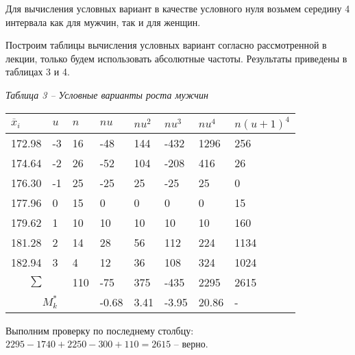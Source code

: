 Для вычисления условных вариант в качестве условного нуля возьмем середину 4 интервала как для мужчин,
так и для женщин.

Построим таблицы вычисления условных вариант согласно рассмотренной в лекции, только будем
использовать абсолютные частоты.
Результаты приведены в таблицах 3 и 4.

\noindent\textit{Таблица 3 -- Условные варианты роста мужчин}
\begin{longtable}{|p{1.7cm}|p{1.7cm}|p{1.7cm}|p{1.7cm}|p{1.7cm}|p{1.7cm}|p{1.7cm}|p{1.9cm}|}
    \hline
    $\overline{x}_i$ & $u$ & $n$ & $nu$ & $nu^2$ & $nu^3$ & $nu^4$ & $n(u+1)^4$ \\\hline
    172.98           & -3  & 16  & -48  & 144    & -432   & 1296   & 256        \\\hline
    174.64           & -2  & 26  & -52  & 104    & -208   & 416    & 26         \\\hline
    176.30           & -1  & 25  & -25  & 25     & -25    & 25     & 0          \\\hline
    177.96           & 0   & 15  & 0    & 0      & 0      & 0      & 15         \\\hline
    179.62           & 1   & 10  & 10   & 10     & 10     & 10     & 160        \\\hline
    181.28           & 2   & 14  & 28   & 56     & 112    & 224    & 1134       \\\hline
    182.94           & 3   & 4   & 12   & 36     & 108    & 324    & 1024       \\\hline
    \multicolumn{2}{|c|}{$\sum$} & 110 & -75 & 375 & -435 & 2295 & 2615 \\\hline
    \multicolumn{3}{|c|}{$M_k^*$} & -0.68 & 3.41 & -3.95 & 20.86 & - \\\hline
\end{longtable}

Выполним проверку по последнему столбцу: $2295 - 1740 + 2250 - 300 + 110 = 2615$ -- верно.

